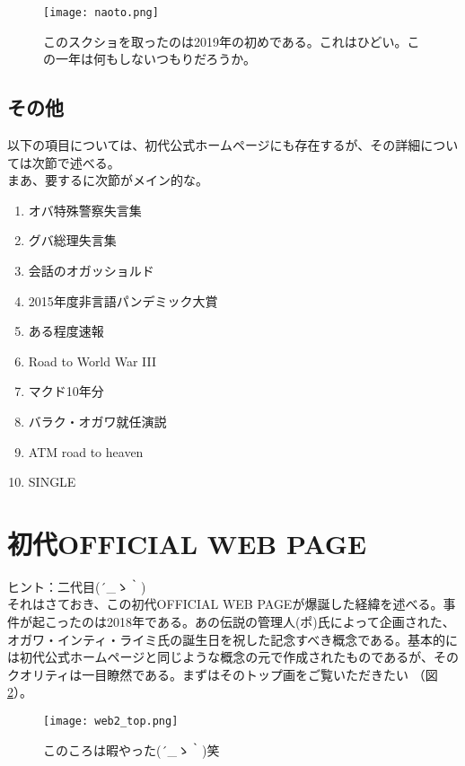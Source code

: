 \begin{figure}[H]
  \centering
  \texttt{[image: naoto.png]}
  \caption{このスクショを取ったのは2019年の初めである。これはひどい。この一年は何もしないつもりだろうか。}
\label{naoto}
\end{figure}


\subsection{その他}
以下の項目については、初代公式ホームページにも存在するが、その詳細については次節で述べる。\\
まあ、要するに次節がメイン的な。
\begin{enumerate}
\item オバ特殊警察失言集
\item グバ総理失言集
\item 会話のオガッショルド
\item 2015年度非言語パンデミック大賞
\item ある程度速報
\item Road to World War III
\item マクド10年分
\item バラク・オガワ就任演説
\item ATM road to heaven
\item SINGLE
\end{enumerate}


\newpage
\section{初代OFFICIAL WEB PAGE}
ヒント：二代目\sf (´\_ゝ｀) \\
それはさておき、この初代OFFICIAL WEB PAGEが爆誕した経緯を述べる。事件が起こったのは2018年である。あの伝説の管理人(ポ)氏によって企画された、オガワ・インティ・ライミ氏の誕生日を祝した記念すべき概念である。基本的には初代公式ホームページと同じような概念の元で作成されたものであるが、そのクオリティは一目瞭然である。まずはそのトップ画をご覧いただきたい （図\ref{web2_top}）。\\

\begin{figure}[H]
  \centering
  \texttt{[image: web2\_top.png]}
  \caption{このころは暇やった\sf (´\_ゝ｀)笑}
\label{web2_top}
\end{figure}

